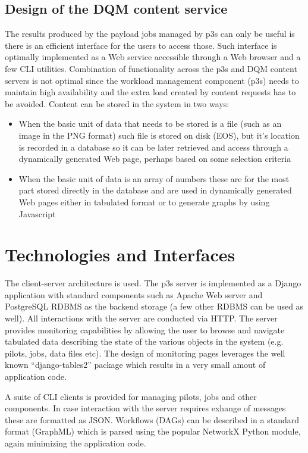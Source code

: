 \documentclass{webofc}
\begin{document}
\subsection{Design of the DQM content service}
The results produced by the payload jobs managed by p3s can only be useful is there is an efficient
interface for the users to access those. Such interface is optimally implemented
as a Web service accessible through a Web browser and a few CLI utilities. Combination of
functionality across the p3s and DQM content servers is not optimal since the workload
management component (p3s) needs to maintain high availability and the extra load created
by content requests has to be avoided. Content can be stored in the system in two ways:
\begin{itemize}

\item When the basic unit of data that needs to be stored is a file (such as an image in the PNG format) such
file is stored on disk (EOS), but it's location is recorded in a database so it can be later retrieved
and access through a dynamically generated Web page, perhaps based on some selection criteria

\item When the basic unit of data is an array of numbers these are for the most part stored directly
in the database and are used in dynamically generated Web pages either in tabulated format or
to generate graphs by using Javascript

\end{itemize}



\section{Technologies and Interfaces}

The client-server architecture is used. The p3s server is implemented as a Django \cite{django} application
with standard components such as Apache Web server and PostgreSQL RDBMS as the backend storage
(a few other RDBMS can be used as well). All interactions with the server
are conducted via HTTP. The server provides monitoring capabilities by allowing the user to browse and navigate
tabulated data describing the state of the various objects in the system (e.g. pilots, jobs, data files etc).
The design of monitoring pages leverages the well known ``django-tables2'' package which results
in a very small amout of application code.

A suite of CLI clients is provided for managing pilots, jobs and
other components. In case interaction with the server requires exhange of messages these are
formatted as JSON. Workflows (DAGs) can be described in a standard format (GraphML) which is parsed
using the popular NetworkX Python module, again minimizing the application code.
\end{document}
